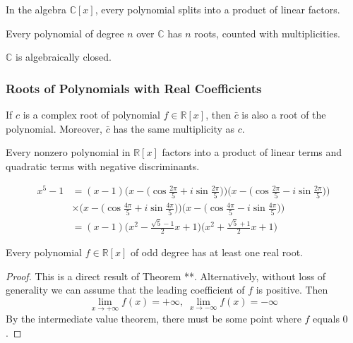     \begin{corollary}
      In the algebra $\mathbb{C}[x]$, every polynomial splits into a product of linear factors. 
    \end{corollary}

    \begin{corollary}
      Every polynomial of degree $n$ over $\mathbb{C}$ has $n$ roots, counted with multiplicities. 
    \end{corollary}

    \begin{corollary}
      $\mathbb{C}$ is algebraically closed. 
    \end{corollary}

  \subsubsection{Roots of Polynomials with Real Coefficients}

    \begin{theorem}
      If $c$ is a complex root of polynomial $f \in \mathbb{R}[x]$, then $\bar{c}$ is also a root of the polynomial. Moreover, $\bar{c}$ has the same multiplicity as $c$. 
    \end{theorem}

    \begin{corollary}
      Every nonzero polynomial in $\mathbb{R}[x]$ factors into a product of linear terms and quadratic terms with negative discriminants. 
    \end{corollary}

    \begin{example}
    \begin{align*}
      x^5 - 1 & = (x-1) \bigg( x - \Big( \cos{\frac{2\pi}{5}} + i \sin{\frac{2\pi}{5}}\Big) \bigg) \bigg( x - \Big( \cos{\frac{2\pi}{5}} - i \sin{\frac{2\pi}{5}}\Big) \bigg) \\
      & \times \bigg( x - \Big( \cos{\frac{4\pi}{5}} + i \sin{\frac{4\pi}{5}}\Big) \bigg) \bigg( x - \Big( \cos{\frac{4\pi}{5}} - i \sin{\frac{4\pi}{5}}\Big) \bigg) \\
      & = (x-1) \bigg( x^2 - \frac{\sqrt{5} - 1}{2} x + 1\bigg) \bigg( x^2 + \frac{\sqrt{5} + 1}{2} x + 1\bigg) 
    \end{align*}
    \end{example}

    \begin{corollary}
      Every polynomial $f \in \mathbb{R}[x]$ of odd degree has at least one real root. 
    \end{corollary}
    \begin{proof}
      This is a direct result of Theorem **. Alternatively, without loss of generality we can assume that the leading coefficient of $f$ is positive. Then
      \begin{equation}
        \lim_{x \rightarrow + \infty} f(x) = + \infty, \; \lim_{x \rightarrow -\infty} f(x) = -\infty
      \end{equation}
      By the intermediate value theorem, there must be some point where $f$ equals $0$. 
    \end{proof}

